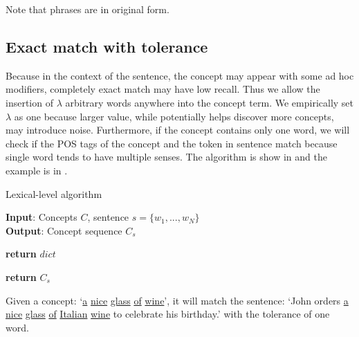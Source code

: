 Note that phrases are in original form.

\subsection{Exact match with tolerance}
Because in the context of the sentence, the concept may appear with some
ad hoc modifiers, completely exact match may have low recall. 
Thus we allow the insertion of $\lambda$ arbitrary words anywhere into the concept term. We empirically set $\lambda$ as one because larger value, while potentially helps discover more concepts, may introduce noise. 
Furthermore, if the concept contains only one word, we will check if the POS tags of the concept and the token in sentence match because single word tends to have multiple senses. The algorithm is show in  and the example is in .

\begin{algorithm}[tb]
	\small
	\caption{Lexical-level algorithm}
	\label{alg:lexical_algo}
	\textbf{Input}: Concepts $C$, sentence $s=\{w_1, ..., w_N\}$\\
	\textbf{Output}: Concept sequence $C_s$ 
	\begin{algorithmic}[1]
		\EndIf
		\EndFor
		\State \textbf{return} {$dict$ }
		\EndProcedure
		
		\EndIf
		\EndFor
		\EndIf
		\EndFor
		\State \textbf{return} {$C_s$ }
		\EndProcedure
	\end{algorithmic}
\end{algorithm}


\begin{example}\label{tolerance}
Given a concept: `\uline{a} \uline{nice} \uline{glass} \uline{of} \uline{wine}', it will match the sentence: `John orders \uline{a} \uline{nice} \uline{glass} \uline{of} \uline{Italian} \uline{wine} to celebrate his birthday.' with the tolerance of one word.
\end{example}


